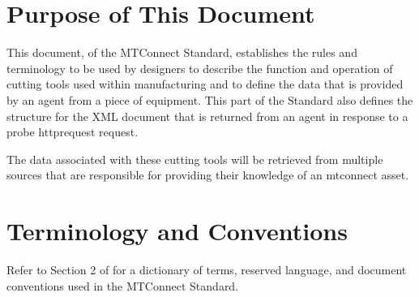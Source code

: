 \section{Purpose of This Document}

This document,  of the MTConnect Standard, establishes the rules and terminology to be used by designers to describe the function and operation of cutting tools used within manufacturing and to define the data that is provided by an \gls{agent} from a piece of equipment.  This part of the Standard also defines the structure for the XML document that is returned from an \gls{agent} in response to a \gls{probe httprequest} request. 

The data associated with these cutting tools will be retrieved from multiple sources that are responsible for providing their knowledge of an \gls{mtconnect asset}.

\section{Terminology and Conventions}
Refer to Section 2 of  for a dictionary of terms, reserved language, and document conventions used in the MTConnect Standard.

\printglossary

\printacronyms  

\printbibliography[title=MTConnect References,keyword=MTC]

\printbibliography[title=Other References,notkeyword=MTC]